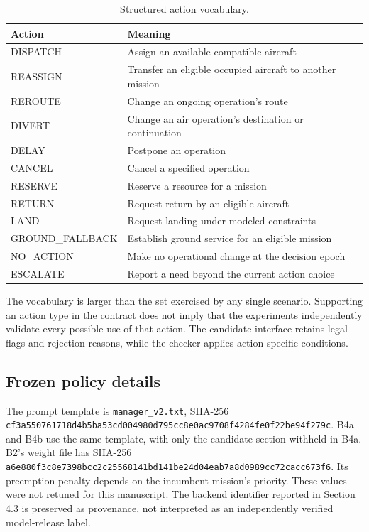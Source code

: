 \documentclass[11pt,a4paper]{article}
\begin{document}
\begin{table}[H]
\centering
\small
\setlength{\tabcolsep}{3pt}
\caption{Structured action vocabulary.}
\label{tab:S9}
\begin{tabularx}{\textwidth}{@{}lY@{}}
\toprule
Action & Meaning \\
\midrule
DISPATCH & Assign an available compatible aircraft \\
REASSIGN & Transfer an eligible occupied aircraft to another mission \\
REROUTE & Change an ongoing operation's route \\
DIVERT & Change an air operation's destination or continuation \\
DELAY & Postpone an operation \\
CANCEL & Cancel a specified operation \\
RESERVE & Reserve a resource for a mission \\
RETURN & Request return by an eligible aircraft \\
LAND & Request landing under modeled constraints \\
GROUND\_FALLBACK & Establish ground service for an eligible mission \\
NO\_ACTION & Make no operational change at the decision epoch \\
ESCALATE & Report a need beyond the current action choice \\
\bottomrule
\end{tabularx}
\end{table}

The vocabulary is larger than the set exercised by any single scenario. Supporting an action type in the contract does not imply that the experiments independently validate every possible use of that action. The candidate interface retains legal flags and rejection reasons, while the checker applies action-specific conditions.

\subsection{Frozen policy details}

The prompt template is \nolinkurl{manager_v2.txt}, SHA-256 \nolinkurl{cf3a550761718d4b5ba53cd004980d795cc8e0ac9708f4284fe0f22be94f279c}. B4a and B4b use the same template, with only the candidate section withheld in B4a. B2's weight file has SHA-256 \nolinkurl{a6e880f3c8e7398bcc2c25568141bd141be24d04eab7a8d0989cc72cacc673f6}. Its preemption penalty depends on the incumbent mission's priority. These values were not retuned for this manuscript. The backend identifier reported in Section 4.3 is preserved as provenance, not interpreted as an independently verified model-release label.
\end{document}
